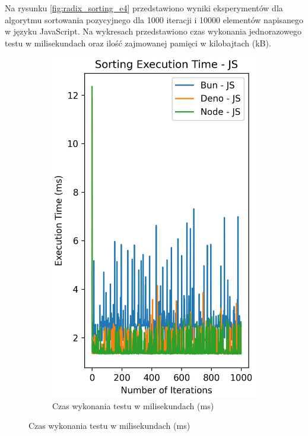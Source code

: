 Na rysunku \ref{fig:radix_sorting_e4} przedstawiono wyniki eksperymentów dla algorytmu sortowania pozycyjnego dla 1000 iteracji i 10000 elementów napisanego w języku JavaScript. Na wykresach przedstawiono czas wykonania jednorazowego testu w milisekundach oraz ilość zajmowanej pamięci w kilobajtach (kB).

\begin{figure}[H]
  \centering
  \begin{subfigure}[b]{0.44\textwidth}
    \centering
    \includegraphics[width=\textwidth]{Figures/sorting/sorting_radix_1000_10000_js_time.png}
    \caption{Czas wykonania testu w milisekundach (ms)}

\end{subfigure}
\end{figure}
